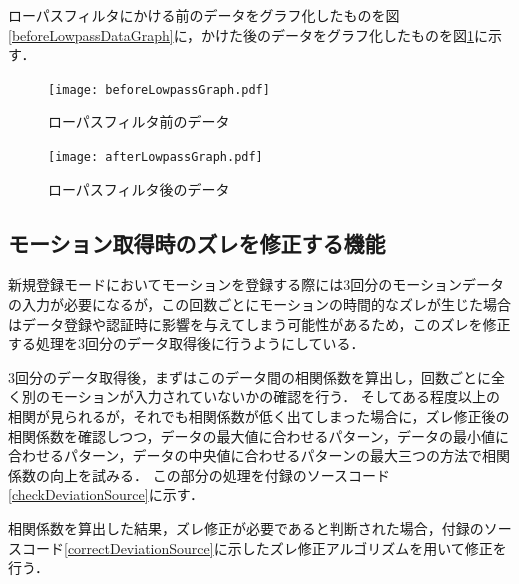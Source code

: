 \documentclass[11pt]{jreport}
\begin{document}
        ローパスフィルタにかける前のデータをグラフ化したものを図\ref{beforeLowpassDataGraph}に，かけた後のデータをグラフ化したものを図\ref{afterLowpassDataGraph}に示す．

        \begin{figure}[!bhtp]
            \begin{minipage}{0.5\hsize}
                \begin{center}
                    \texttt{[image: beforeLowpassGraph.pdf]}
                \end{center}
                \caption{ローパスフィルタ前のデータ}
                \label{beforeLowpassDataGraph}
            \end{minipage}
            \begin{minipage}{0.5\hsize}
                \begin{center}
                    \texttt{[image: afterLowpassGraph.pdf]}
                \end{center}
                \caption{ローパスフィルタ後のデータ}
                \label{afterLowpassDataGraph}
            \end{minipage}
        \end{figure}

        \subsection{モーション取得時のズレを修正する機能}
        新規登録モードにおいてモーションを登録する際には3回分のモーションデータの入力が必要になるが，この回数ごとにモーションの時間的なズレが生じた場合はデータ登録や認証時に影響を与えてしまう可能性があるため，このズレを修正する処理を3回分のデータ取得後に行うようにしている．

        3回分のデータ取得後，まずはこのデータ間の相関係数を算出し，回数ごとに全く別のモーションが入力されていないかの確認を行う．
        そしてある程度以上の相関が見られるが，それでも相関係数が低く出てしまった場合に，ズレ修正後の相関係数を確認しつつ，データの最大値に合わせるパターン，データの最小値に合わせるパターン，データの中央値に合わせるパターンの最大三つの方法で相関係数の向上を試みる．
        この部分の処理を付録のソースコード\ref{checkDeviationSource}に示す．

        相関係数を算出した結果，ズレ修正が必要であると判断された場合，付録のソースコード\ref{correctDeviationSource}に示したズレ修正アルゴリズムを用いて修正を行う．
\end{document}
